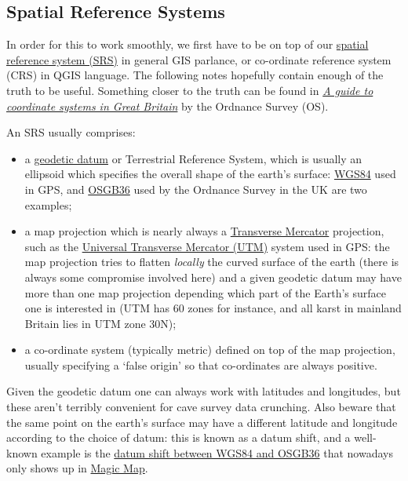 \documentclass[]{article}
\begin{document}
\subsection{Spatial Reference Systems}\label{spatial-reference-systems}

In order for this to work smoothly, we first have to be on top of our
\href{https://en.wikipedia.org/wiki/Spatial_reference_system}{spatial
reference system (SRS)} in general GIS parlance, or co-ordinate
reference system (CRS) in QGIS language. The following notes hopefully
contain enough of the truth to be useful. Something closer to the truth
can be found in
\href{https://www.ordnancesurvey.co.uk/docs/support/guide-coordinate-systems-great-britain.pdf}{{\it A guide to coordinate systems in 
Great Britain}} by the Ordnance Survey (OS).

An SRS usually comprises:

\begin{itemize}
\item
  a \href{https://en.wikipedia.org/wiki/Geodetic_datum}{geodetic
    datum} or Terrestrial Reference System, which is usually an
  ellipsoid which specifies the overall shape of the earth's surface:
  \href{https://en.wikipedia.org/wiki/World_Geodetic_System}{WGS84}
  used in GPS, and 
  \href{https://en.wikipedia.org/wiki/Ordnance_Survey_National_Grid}{OSGB36}
  used by the Ordnance Survey in the UK are two examples;
\item
  a map projection which is nearly always a
  \href{https://en.wikipedia.org/wiki/Transverse_Mercator_projection}{Transverse
    Mercator} projection, such as the
  \href{https://en.wikipedia.org/wiki/Universal_Transverse_Mercator_coordinate_system}{Universal
    Transverse Mercator (UTM)} system used in GPS: the map projection
  tries to flatten \emph{locally} the curved surface of the earth
  (there is always some compromise involved here) and a given geodetic
  datum may have more than one map projection depending which part of
  the Earth's surface one is interested in (UTM has 60 zones for
  instance, and all karst in mainland Britain lies in UTM zone 30N);
\item
  a co-ordinate system (typically metric) defined on top of the map
  projection, usually specifying a `false origin' so that
  co-ordinates are always positive.
\end{itemize}

Given the geodetic datum one can always work with latitudes and
longitudes, but these aren't terribly convenient for cave survey data
crunching. Also beware that the same point on the earth's surface may
have a different latitude and longitude according to the choice of
datum: this is known as a datum shift, and a well-known example is the
\href{https://en.wikipedia.org/wiki/Ordnance_Survey_National_Grid\#Datum_shift_between_OSGB_36_and_WGS_84}{datum
  shift between WGS84 and OSGB36} that nowadays only shows up in
\href{http://www.natureonthemap.naturalengland.org.uk/MagicMap.aspx}{Magic
  Map}.
\end{document}
